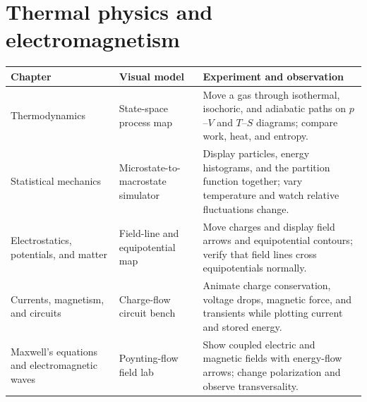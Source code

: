\documentclass[11pt,oneside]{book}
\theoremstyle{reviewstyle}
\begin{document}
\section{Thermal physics and electromagnetism}
\begin{longtable}{p{}p{}p{}}
\toprule Chapter & Visual model & Experiment and observation\\ \midrule
\endhead
Thermodynamics & State-space process map & Move a gas through isothermal, isochoric, and adiabatic paths on $p$--$V$ and $T$--$S$ diagrams; compare work, heat, and entropy.\\
Statistical mechanics & Microstate-to-macrostate simulator & Display particles, energy histograms, and the partition function together; vary temperature and watch relative fluctuations change.\\
Electrostatics, potentials, and matter & Field-line and equipotential map & Move charges and display field arrows and equipotential contours; verify that field lines cross equipotentials normally.\\
Currents, magnetism, and circuits & Charge-flow circuit bench & Animate charge conservation, voltage drops, magnetic force, and transients while plotting current and stored energy.\\
Maxwell's equations and electromagnetic waves & Poynting-flow field lab & Show coupled electric and magnetic fields with energy-flow arrows; change polarization and observe transversality.\\
\bottomrule
\end{longtable}
\end{document}
